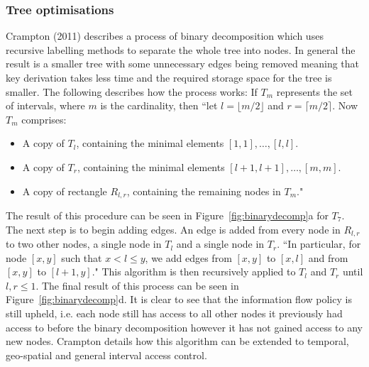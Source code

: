 \documentclass[12pt, titlepage]{article}
\begin{document}
\subsubsection{Tree optimisations}
Crampton (2011) describes a process of binary decomposition which uses recursive labelling methods to separate the whole tree into nodes.\cite{mainPaper} In general the result is a smaller tree with some unnecessary edges being removed meaning that key derivation takes less time and the required storage space for the tree is smaller. The following describes how the process works:
\newline \indent If $T_{m}$ represents the set of intervals, where $m$ is the cardinality, then ``let $l = \lfloor m/2 \rfloor$ and $r = \lceil m/2 \rceil$. Now $T_{m}$ comprises:
\begin{itemize}
\item A copy of $T_{l}$, containing the minimal elements $[1, 1], \dots , [l,l]$.
\item A copy of $T_{r}$, containing the minimal elements $[l + 1, l + 1], \dots , [m, m]$.
\item A copy of rectangle $R_{l,r}$, containing the remaining nodes in $T_{m}$."
\end{itemize}
The result of this procedure can be seen in Figure~\ref{fig:binarydecomp}a for $T_{7}$.
\newline The next step is to begin adding edges. An edge is added from every node in $R_{l,r}$ to two other nodes, a single node in $T_{l}$ and a single node in $T_{r}$. ``In particular, for node $[x, y]$ such that $x<l≤y$, we add edges from $[x, y]$ to $[x, l]$ and from $[x, y]$ to $[l + 1, y]$."
\newline This algorithm is then recursively applied to $T_{l}$ and $T_{r}$ until $l, r ≤ 1$. The final result of this process can be seen in Figure~\ref{fig:binarydecomp}d.
\newline \indent It is clear to see that the information flow policy is still upheld, i.e. each node still has access to all other nodes it previously had access to before the binary decomposition however it has not gained access to any new nodes.
\newline \indent Crampton details how this algorithm can be extended to temporal, geo-spatial and general interval access control.
\end{document}
